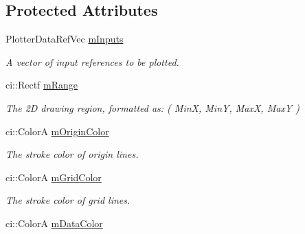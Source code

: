 \subsection*{Protected Attributes}
\begin{DoxyCompactItemize}
\item 
\hypertarget{class_gui_plot_aa53372b5d96d2a55ebd85d0e02b49da4}{Plotter\-Data\-Ref\-Vec \hyperlink{class_gui_plot_aa53372b5d96d2a55ebd85d0e02b49da4}{m\-Inputs}}\label{class_gui_plot_aa53372b5d96d2a55ebd85d0e02b49da4}

\begin{DoxyCompactList}\small\item\em A vector of input references to be plotted. \end{DoxyCompactList}\item 
\hypertarget{class_gui_plot_a340e4fa2f245e2cb134102d5f1b9e0b4}{ci\-::\-Rectf \hyperlink{class_gui_plot_a340e4fa2f245e2cb134102d5f1b9e0b4}{m\-Range}}\label{class_gui_plot_a340e4fa2f245e2cb134102d5f1b9e0b4}

\begin{DoxyCompactList}\small\item\em The 2\-D drawing region, formatted as\-: ( Min\-X, Min\-Y, Max\-X, Max\-Y ) \end{DoxyCompactList}\item 
\hypertarget{class_gui_plot_a7d106375879c41e9f1d0d08c97fa4f6f}{ci\-::\-Color\-A \hyperlink{class_gui_plot_a7d106375879c41e9f1d0d08c97fa4f6f}{m\-Origin\-Color}}\label{class_gui_plot_a7d106375879c41e9f1d0d08c97fa4f6f}

\begin{DoxyCompactList}\small\item\em The stroke color of origin lines. \end{DoxyCompactList}\item 
\hypertarget{class_gui_plot_af945f1aadca62c805ea3730c04054de2}{ci\-::\-Color\-A \hyperlink{class_gui_plot_af945f1aadca62c805ea3730c04054de2}{m\-Grid\-Color}}\label{class_gui_plot_af945f1aadca62c805ea3730c04054de2}

\begin{DoxyCompactList}\small\item\em The stroke color of grid lines. \end{DoxyCompactList}\item 
\hypertarget{class_gui_plot_a181cbc5b42a3621017846500008d2e38}{ci\-::\-Color\-A \hyperlink{class_gui_plot_a181cbc5b42a3621017846500008d2e38}{m\-Data\-Color}}\label{class_gui_plot_a181cbc5b42a3621017846500008d2e38}


\end{DoxyCompactItemize}
